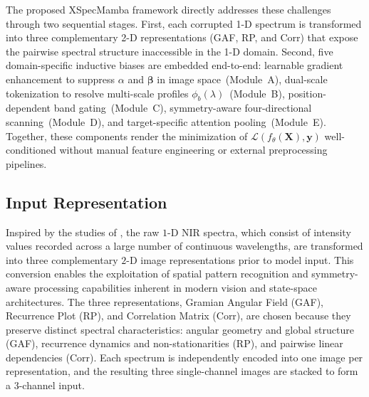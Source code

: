 \documentclass[pdflatex,sn-mathphys-num]{sn-jnl}%
\begin{document}
The proposed XSpecMamba framework directly addresses 
these challenges through two sequential stages. First, 
each corrupted 1-D spectrum is transformed into three 
complementary 2-D representations (GAF, RP, and Corr) 
that expose the pairwise spectral structure inaccessible 
in the 1-D domain. Second, five domain-specific inductive 
biases are embedded end-to-end: learnable gradient 
enhancement to suppress $\alpha$ and $\boldsymbol{\beta}$ 
in image space~(Module~A), dual-scale tokenization to 
resolve multi-scale profiles $\phi_b(\lambda)$~(Module~B), 
position-dependent band gating~(Module~C), 
symmetry-aware four-directional scanning~(Module~D), 
and target-specific attention pooling~(Module~E). 
Together, these components render the minimization of 
$\mathcal{L}(f_\theta(\mathbf{X}), \mathbf{y})$ 
well-conditioned without manual feature engineering 
or external preprocessing pipelines.

\subsection{Input Representation}\label{sec:input-representation}
Inspired by the studies of \cite{van2024nirsvit,zhang2025near,li2024combined,liu2025effective,xiaoming2004generalized}, the raw $1$-D NIR spectra, which consist of intensity values recorded across a large number of continuous wavelengths, are transformed into three complementary $2$-D image representations prior to model input. This conversion enables the exploitation of spatial pattern recognition and symmetry-aware processing capabilities inherent in modern vision and state-space architectures. The three representations, Gramian Angular Field (GAF), Recurrence Plot (RP), and Correlation Matrix (Corr), are chosen because they preserve distinct spectral characteristics: angular geometry and global structure (GAF), recurrence dynamics and non-stationarities (RP), and pairwise linear dependencies (Corr). Each spectrum is independently encoded into one image per representation, and the resulting three single-channel images are stacked to form a $3$-channel input.
\end{document}
